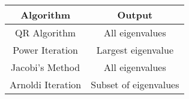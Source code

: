 \begin{tabular}{|c|c|}
        \hline
        \textbf{Algorithm} & \textbf{Output} \\
        \hline
        QR Algorithm & All eigenvalues \\
        \hline
        Power Iteration & Largest eigenvalue \\
        \hline
        Jacobi's Method & All eigenvalues \\
        \hline
        Arnoldi Iteration & Subset of eigenvalues \\
        \hline
\end{tabular}
